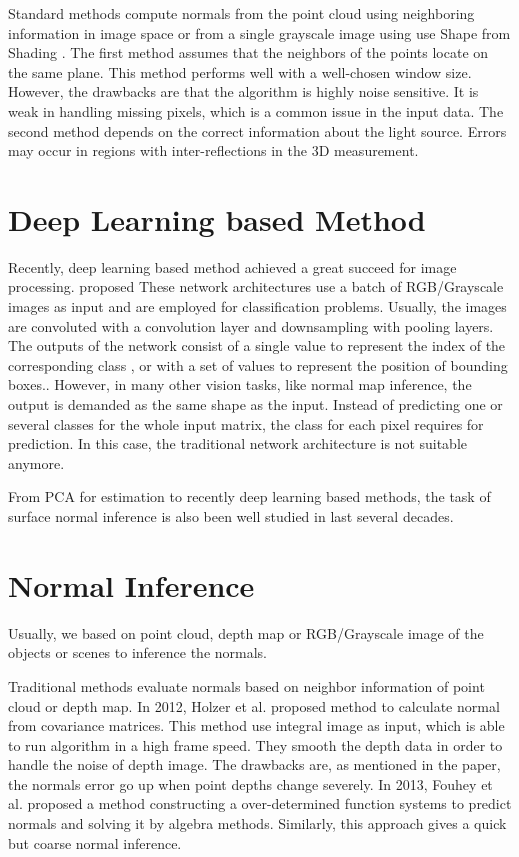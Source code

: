 Standard methods compute normals from the point cloud using neighboring information in image space or from a single grayscale image using use Shape from Shading \cite{SFS}. The first method assumes that the neighbors of the points locate on the same plane. This method performs well with a well-chosen window size. However, the drawbacks are that the algorithm is highly noise sensitive. It is weak in handling missing pixels, which is a common issue in the input data. The second method depends on the correct information about the light source. Errors may occur in regions with inter-reflections in the 3D measurement. 


\section{Deep Learning based Method}

Recently, deep learning based method achieved a great succeed for image processing.  \cite{yolov3} proposed  \cite{efficientDet} These network architectures use a batch of RGB/Grayscale images as input and are employed for classification problems. Usually, the images are convoluted with a convolution layer and downsampling with pooling layers. The outputs of the network consist of a single value to represent the index of the corresponding class \cite{efficientDet}, or with a set of values to represent the position of bounding boxes.\cite{yolov3}. However, in many other vision tasks, like normal map inference, the output is demanded as the same shape as the input. Instead of predicting one or several classes for the whole input matrix, the class for each pixel requires for prediction. In this case, the traditional network architecture is not suitable anymore.

From PCA for estimation to recently deep learning based methods, the task of surface normal inference is also been well studied in last several decades. 


\section{Normal Inference}

Usually, we based on point cloud, depth map or RGB/Grayscale image of the objects or scenes to inference the normals. 

Traditional methods evaluate normals based on neighbor information of point cloud or depth map.
In 2012, Holzer et al. \cite{Holzer.S} proposed method to calculate normal from covariance matrices. 
This method use integral image as input, which is able to run algorithm in a high frame speed. They smooth the depth data in order to handle the noise of depth image. The drawbacks are, as mentioned in the paper, the normals error go up when point depths change severely. In 2013, Fouhey et al. \cite{geometry_based_solution} proposed a method constructing a over-determined function systems to predict normals and solving it 
by algebra methods. Similarly, this approach gives a quick but coarse normal inference. 


